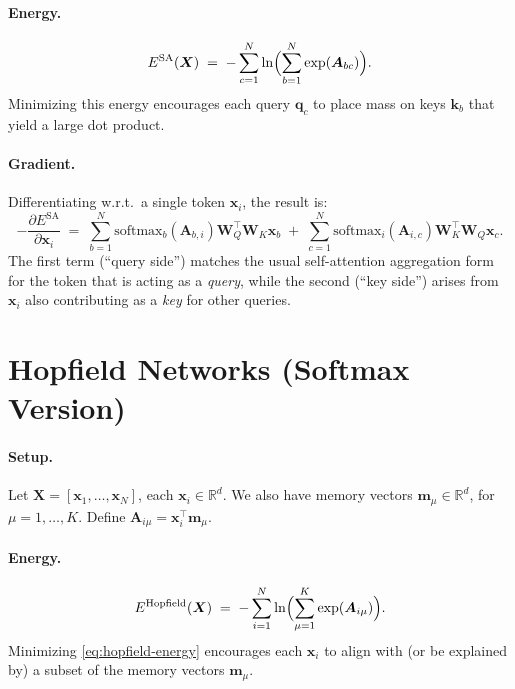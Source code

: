 \documentclass{article}
\begin{document}
\paragraph{Energy.}
\begin{equation}
E^{\mathrm{SA}}(\bm{X})
\;=\;
-\sum_{c=1}^N 
\ln \Bigl(\sum_{b=1}^N \exp(\bm{A}_{bc})\Bigr).
\label{eq:sa-energy}
\end{equation}
Minimizing this energy encourages each query \(\bm{q}_c\) to place mass on keys \(\bm{k}_b\) that yield a large dot product.

\paragraph{Gradient.}
Differentiating w.r.t.\ a single token \(\bm{x}_i\), the result is:
\begin{equation}
-\frac{\partial E^{\mathrm{SA}}}{\partial \bm{x}_i}
\;=\;
\sum_{b=1}^N \text{softmax}_b(\bm{A}_{b,i}) 
\bm{W}_Q^\top \bm{W}_K \bm{x}_b
\;+\;
\sum_{c=1}^N \text{softmax}_i(\bm{A}_{i,c}) 
\bm{W}_K^\top \bm{W}_Q \bm{x}_c.
\end{equation}
The first term (``query side'') matches the usual self-attention aggregation form for the token that is acting as a \emph{query}, while the second (``key side'') arises from \(\bm{x}_i\) also contributing as a \emph{key} for other queries.


\section{Hopfield Networks (Softmax Version)}

\paragraph{Setup.}
Let \(\bm{X} = [\bm{x}_1, \ldots, \bm{x}_N]\), each \(\bm{x}_i \in \mathbb{R}^d\).  
We also have memory vectors \(\bm{m}_\mu \in \mathbb{R}^d\), for \(\mu = 1,\ldots,K\).  
Define
\(\bm{A}_{i\mu} = \bm{x}_i^\top \bm{m}_\mu.\)

\paragraph{Energy.}
\begin{equation}
E^{\mathrm{Hopfield}}(\bm{X})
\;=\;
-\sum_{i=1}^N
\ln \Bigl(\sum_{\mu=1}^K \exp(\bm{A}_{i\mu})\Bigr).
\label{eq:hopfield-energy}
\end{equation}
Minimizing \eqref{eq:hopfield-energy} encourages each \(\bm{x}_i\) to align with (or be explained by) a subset of the memory vectors \(\bm{m}_\mu\).
\end{document}
